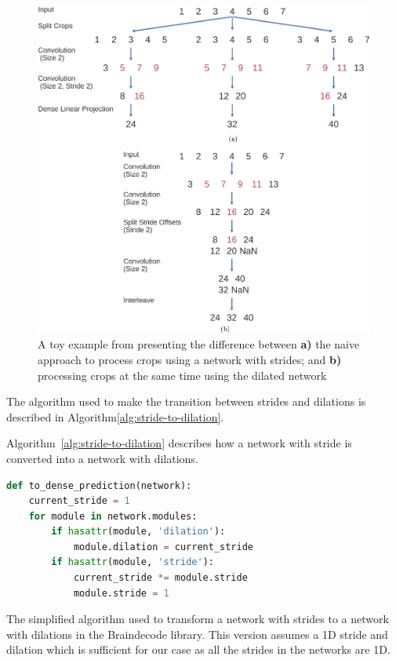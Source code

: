 \begin{figure}[!htbp]
\centering
\includegraphics[width=\linewidth]{img/ch3/cropped-decoding-scheme}
\caption[Processing crops]{A toy example from \cite{schirrmeister-deep-2017} presenting the difference between \textbf{a)} the naive approach to process crops using a network with strides; and \textbf{b)} processing crops at the same time using the dilated network}
\label{fig:cropped-decoding-scheme}
\end{figure}

The algorithm used to make the transition between strides and dilations is described in Algorithm\ref{alg:stride-to-dilation}.

Algorithm~\ref{alg:stride-to-dilation} describes how a network with stride is converted into a network with dilations.\\
\begin{algorithm}
\begin{lstlisting}[language=Python,label={lst:lstlisting}]
def to_dense_prediction(network):
	current_stride = 1
	for module in network.modules:
		if hasattr(module, 'dilation'):
			module.dilation = current_stride
		if hasattr(module, 'stride'):
			current_stride *= module.stride
			module.stride = 1
\end{lstlisting}
\caption{The simplified algorithm used to transform a network with strides to a network with dilations in the Braindecode library.
This version assumes a 1D stride and dilation which is sufficient for our case as all the strides in the networks are 1D.
}
\label{alg:stride-to-dilation}
\end{algorithm}

